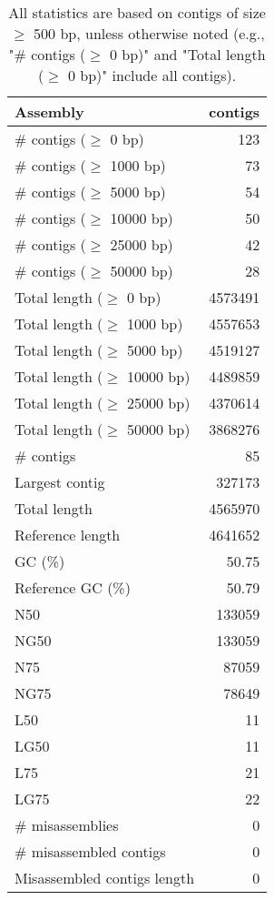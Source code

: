 \documentclass[12pt,a4paper]{article}
\begin{document}
\begin{table}[ht]
\begin{center}
\caption{All statistics are based on contigs of size $\geq$ 500 bp, unless otherwise noted (e.g., "\# contigs ($\geq$ 0 bp)" and "Total length ($\geq$ 0 bp)" include all contigs).}
\begin{tabular}{|l*{1}{|r}|}
\hline
Assembly & contigs \\ \hline
\# contigs ($\geq$ 0 bp) & 123 \\ \hline
\# contigs ($\geq$ 1000 bp) & 73 \\ \hline
\# contigs ($\geq$ 5000 bp) & 54 \\ \hline
\# contigs ($\geq$ 10000 bp) & 50 \\ \hline
\# contigs ($\geq$ 25000 bp) & 42 \\ \hline
\# contigs ($\geq$ 50000 bp) & 28 \\ \hline
Total length ($\geq$ 0 bp) & 4573491 \\ \hline
Total length ($\geq$ 1000 bp) & 4557653 \\ \hline
Total length ($\geq$ 5000 bp) & 4519127 \\ \hline
Total length ($\geq$ 10000 bp) & 4489859 \\ \hline
Total length ($\geq$ 25000 bp) & 4370614 \\ \hline
Total length ($\geq$ 50000 bp) & 3868276 \\ \hline
\# contigs & 85 \\ \hline
Largest contig & 327173 \\ \hline
Total length & 4565970 \\ \hline
Reference length & 4641652 \\ \hline
GC (\%) & 50.75 \\ \hline
Reference GC (\%) & 50.79 \\ \hline
N50 & 133059 \\ \hline
NG50 & 133059 \\ \hline
N75 & 87059 \\ \hline
NG75 & 78649 \\ \hline
L50 & 11 \\ \hline
LG50 & 11 \\ \hline
L75 & 21 \\ \hline
LG75 & 22 \\ \hline
\# misassemblies & 0 \\ \hline
\# misassembled contigs & 0 \\ \hline
Misassembled contigs length & 0 \\ \hline

\end{tabular}
\end{center}
\end{table}
\end{document}
